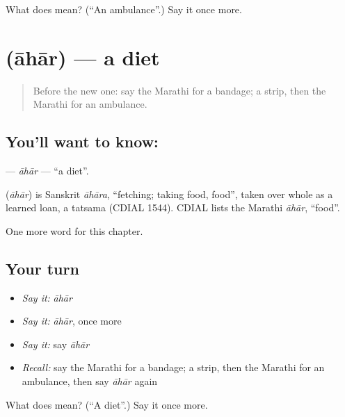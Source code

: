 \begin{tcolorbox}[breakable,colback=teal!4,colframe=teal!35!black,title={Before you move on}]
What does  mean? (\textquotedblleft{}An ambulance\textquotedblright{}.) Say it once more.
\end{tcolorbox}
\section[\texorpdfstring{\mr{आहार} (āhār)}{आहार (āhār)}]{ (āhār) — a diet}

\label{lesson:MR-C229-ahar}



\begin{quote}
Before the new one: say the Marathi for a bandage; a strip, then the Marathi for an ambulance.
\end{quote}

\subsection*{You'll want to know: }
\textbf{} — \emph{āhār} — \textquotedblleft{}a diet\textquotedblright{}.

\begin{cousinweb}
\textbf{} (\emph{āhār}) is Sanskrit \emph{āhāra}, \textquotedblleft{}fetching; taking food, food\textquotedblright{}, taken over whole as a learned loan, a tatsama (CDIAL 1544). CDIAL lists the Marathi \emph{āhār}, \textquotedblleft{}food\textquotedblright{}.
\end{cousinweb}

\begin{grammarlens}[title={What you've built}]
One more word for this chapter.
\end{grammarlens}

\subsection*{Your turn}
\begin{itemize}
\raggedright
  \item \emph{Say it:} \emph{āhār}
  \item \emph{Say it:} \emph{āhār}, once more
  \item \emph{Say it:} say \emph{āhār}
  \item \emph{Recall:} say the Marathi for a bandage; a strip, then the Marathi for an ambulance, then say \emph{āhār} again
\end{itemize}

\begin{tcolorbox}[breakable,colback=teal!4,colframe=teal!35!black,title={Before you move on}]
What does  mean? (\textquotedblleft{}A diet\textquotedblright{}.) Say it once more.
\end{tcolorbox}
